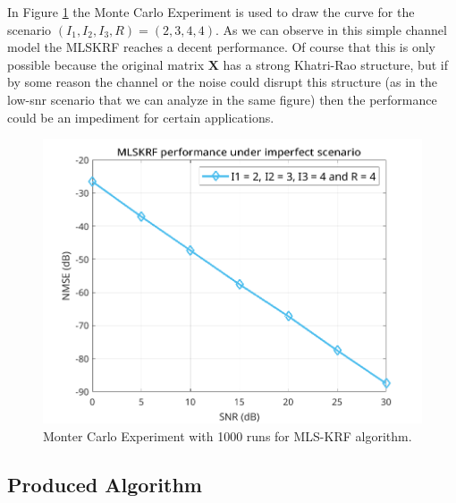 \documentclass[a4paper,10pt]{article}
\begin{document}
    In Figure \ref{fig:hw9} the Monte Carlo Experiment is used to draw the curve for the scenario $(I_{1},I_{2},I_{3},R) = (2,3,4,4)$.
    As we can observe in this simple channel model the MLSKRF reaches a decent performance. Of course that this is only possible because the original matrix $\boldsymbol{X}$ has
    a strong Khatri-Rao structure, but if by some reason the channel or the noise could disrupt this structure (as in the low-snr scenario that we can analyze in the same figure) 
    then the performance could be an impediment for certain applications. 

    \begin{figure}[ht!]
        \centering 
        \includegraphics[width=0.65\linewidth]{figs/hw9.png} \par 
        \caption{Monter Carlo Experiment with 1000 runs for MLS-KRF algorithm.}
        \label{fig:hw9} 
    \end{figure}

    \newpage
    \subsection*{Produced Algorithm}
\end{document}
